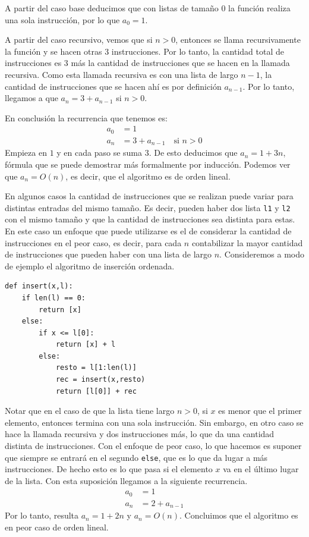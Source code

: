 \documentclass[a4paper, 12pt]{report}
\newcommand{\te}{\text}
\theoremstyle{definition}
\begin{document}
A partir del caso base deducimos que con listas de tamaño $0$ la función realiza una sola instrucción, por lo que $a_0=1$.

A partir del caso recursivo, vemos que si $n>0$, entonces se llama recursivamente la función y se hacen otras 3 instrucciones. Por lo tanto, la cantidad total de instrucciones es 3 más la cantidad de instrucciones que se hacen en la llamada recursiva. Como esta llamada recursiva es con una lista de largo $n-1$, la cantidad de instrucciones que se hacen ahí es por definición $a_{n-1}$. Por lo tanto, llegamos a que $a_n = 3 + a_{n-1}$ si $n>0$.

En conclusión la recurrencia que tenemos es:
\begin{align*}
	a_0 &= 1\\
	a_n &= 3 + a_{n-1}\quad \te{si $n>0$}
\end{align*}
Empieza en $1$ y en cada paso se suma $3$. De esto deducimos que $a_n=1+3n$, fórmula que se puede demostrar más formalmente por inducción. Podemos ver que $a_n=O(n)$, es decir, que el algoritmo es de orden lineal.

En algunos casos la cantidad de instrucciones que se realizan puede variar para distintas entradas del mismo tamaño. Es decir, pueden haber dos lista {\tt l1} y {\tt l2} con el mismo tamaño y que la cantidad de instrucciones sea distinta para estas. En este caso un enfoque que puede utilizarse es el de considerar la cantidad de instrucciones en el peor caso, es decir, para cada $n$ contabilizar la mayor cantidad de instrucciones que pueden haber con una lista de largo $n$. Consideremos a modo de ejemplo el algoritmo de inserción ordenada.
\begin{verbatim}
def insert(x,l):
    if len(l) == 0:
        return [x]
    else:
        if x <= l[0]:
            return [x] + l
        else:
            resto = l[1:len(l)]
            rec = insert(x,resto)
            return [l[0]] + rec
\end{verbatim}
Notar que en el caso de que la lista tiene largo $n>0$, si $x$ es menor que el primer elemento, entonces termina con una sola instrucción. Sin embargo, en otro caso se hace la llamada recursiva y dos instrucciones más, lo que da una cantidad distinta de instrucciones. Con el enfoque de peor caso, lo que hacemos es suponer que siempre se entrará en el segundo {\tt else}, que es lo que da lugar a más instrucciones. De hecho esto es lo que pasa si el elemento $x$ va en el último lugar de la lista. Con esta suposición llegamos a la siguiente recurrencia.
\begin{align*}
	a_0 &= 1\\
	a_n &= 2 + a_{n-1}
\end{align*}
Por lo tanto, resulta $a_n = 1 + 2n$ y $a_n = O(n)$. Concluimos que el algoritmo es en peor caso de orden lineal.
\end{document}
